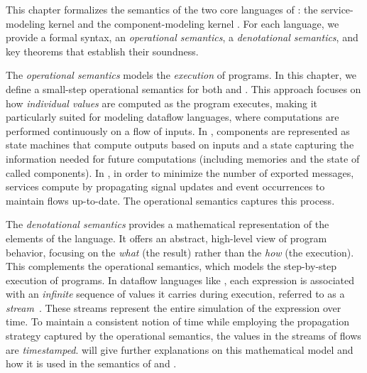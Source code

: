 This chapter formalizes the semantics of the two core languages of \GRust: the service-modeling
kernel \GRFRP and the component-modeling kernel \GRSync. For each language, we provide a formal
syntax, an \emph{operational semantics}, a \emph{denotational semantics}, and key theorems that
establish their soundness.

The \emph{operational semantics} models the \emph{execution} of programs. In this chapter, we define
a small-step operational semantics for both \GRFRP and \GRSync. This approach focuses on how
\emph{individual values} are computed as the program executes, making it particularly suited for
modeling dataflow languages, where computations are performed continuously on a flow of inputs.
%
In \GRSync, components are represented as state machines that compute outputs based on inputs and a
state capturing the information needed for future computations (including  memories and the
state of called components).
%
In \GRFRP, in order to minimize the number of exported messages, services compute by propagating
signal updates and event occurrences to maintain flows up-to-date. The operational
semantics captures this process.
%

The \emph{denotational semantics} provides a mathematical representation of the elements of the
language. It offers an abstract, high-level view of program behavior, focusing on the \emph{what}
(the result) rather than the \emph{how} (the execution). This complements the operational semantics,
which models the step-by-step execution of programs.
%
In dataflow languages like \GRust, each expression is associated with an \emph{infinite} sequence
of values it carries during execution, referred to as a
\emph{stream}~\cite{DBLP:conf/ifip/Kahn74,DBLP:journals/tecs/BourkePP23,DBLP:journals/tcad/LeeS98}.
These streams represent the entire simulation of the expression over time. To maintain a consistent
notion of time while employing the propagation strategy captured by the operational semantics, the
values in the streams of \GRFRP flows are \emph{timestamped}.  will give
further explanations on this mathematical model and how it is used in the semantics of \GRSync and
\GRFRP.

